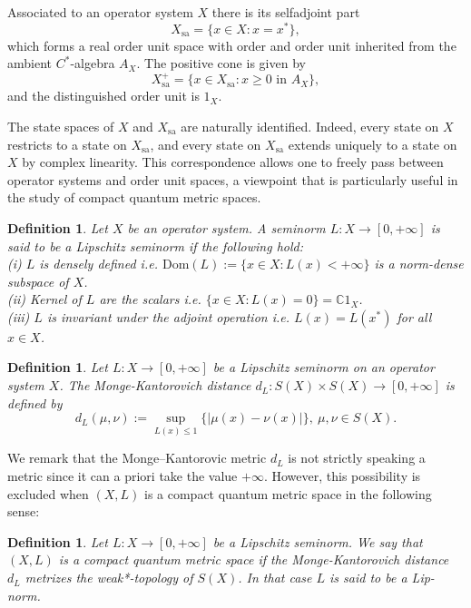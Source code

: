 \documentclass[a4paper,11pt,reqno]{amsart}
\theoremstyle{plain}
\newtheorem{defn}[thm]{Definition}
\theoremstyle{mainthmstyle}
\theoremstyle{named}
\numberwithin{equation}{section}
\begin{document}
Associated to an operator system \(X\) there is its selfadjoint part
\[
X_{\mathrm{sa}}=\{x\in X:x=x^{*}\},
\]
which forms a real order unit space with order and order unit inherited from
the ambient \(C^{*}\)-algebra \(A_{X}\). The positive cone is given by
\[
X_{\mathrm{sa}}^{+}
=
\{x\in X_{\mathrm{sa}}:x\geq 0 \text{ in } A_{X}\},
\]
and the distinguished order unit is \(1_{X}\).

The state spaces of \(X\) and \(X_{\mathrm{sa}}\) are naturally identified.
Indeed, every state on \(X\) restricts to a state on \(X_{\mathrm{sa}}\), and
every state on \(X_{\mathrm{sa}}\) extends uniquely to a state on \(X\) by
complex linearity. This correspondence allows one to freely pass between 
operator systems and order unit spaces, a viewpoint that is particularly useful
in the study of compact quantum metric spaces.
\begin{defn}
    Let $X$ be an operator system. A seminorm $L:X\rightarrow [0,+\infty]$ is said to be a Lipschitz seminorm if the following hold:\\
    \indent (i) $L$ is densely defined i.e. $\mathrm{Dom}(L):=\{x\in X: L(x)<+\infty\}$ is a norm-dense subspace of $X$.\\
    \indent (ii) Kernel of $L$ are the scalars i.e. $\{x\in X:L(x)=0\}=\mathbb{C}1_{X}$.\\
    \indent (iii) $L$ is invariant under the adjoint operation i.e. $L(x)=L(x^{\ast})$ for all $x\in X$.\\
\end{defn}
\begin{defn}
    Let $L:X\rightarrow[0,+\infty]$ be a Lipschitz seminorm on an operator system $X$. The Monge-Kantorovich distance $d_{L}:S(X)\times S(X)\rightarrow [0,+\infty]$ is defined by 
    \begin{displaymath}
        d_{L}(\mu,\nu):=\sup\limits_{L(x)\leq 1}\{\lvert\mu(x)-\nu(x)\rvert\}, \ \mu,\nu\in S(X).
    \end{displaymath}
\end{defn}
We remark that the Monge–Kantorovic metric  $d_{L}$ is not strictly speaking a metric since it can a priori take the value $+\infty$. However, this possibility is excluded when $(X,L)$ is a compact quantum metric space in the following sense:
\begin{defn}
\label{CQMSdefn}
    Let $L:X\rightarrow [0,+\infty]$ be a Lipschitz seminorm. We say that $(X,L)$ is a compact quantum metric space if the Monge-Kantorovich distance $d_{L}$ metrizes the weak*-topology of $S(X)$. In that case $L$ is said to be a Lip-norm.
\end{defn}
\end{document}
